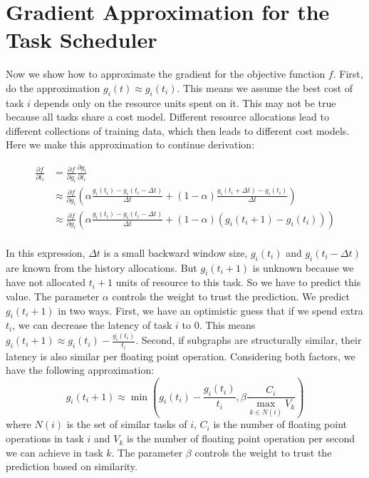 \section{Gradient Approximation for the Task Scheduler}
\label{sec:gradient-approximation}
Now we show how to approximate the gradient for the objective function $f$. First, do the approximation $g_i(t) \approx g_i(t_i)$.
This means we assume the best cost of task $i$ depends only on the resource units spent on it. This may not be true because all tasks share a cost model. Different resource allocations lead to different collections of training data, which then leads to different cost models.
Here we make this approximation to continue derivation:

\begin{align*}
\frac{\partial f}{\partial t_i} &= \frac{\partial f}{\partial g_i} \frac{\partial g_i}{\partial t_i} \\
&\approx \frac{\partial f}{\partial g_i} (\alpha \frac{g_i(t_i) - g_i(t_i - \Delta t)}{\Delta t}  
+ (1-\alpha)  \frac{g_i(t_i + \Delta t) - g_i(t_i)}{\Delta t} ) \\
&\approx \frac{\partial f}{\partial g_i} (\alpha \frac{g_i(t_i) - g_i(t_i - \Delta t)}{\Delta t}  
+ (1-\alpha)  (g_i(t_i + 1) - g_i(t_i))) \\
\end{align*}

\noindent In this expression, $\Delta t$ is a small backward window size, $g_i(t_i)$ and $g_i(t_i - \Delta t)$ are known from the history allocations. But $g_i(t_i + 1)$ is unknown because we have not allocated $t_i + 1$ units of resource to this task. So we have to predict this value.
The parameter $\alpha$ controls the weight to trust the prediction.
We predict $g_i(t_i + 1)$ in two ways. First, we have an optimistic guess that if we spend extra $t_i$, we can decrease the latency of task $i$ to 0. This means $g_i(t_i + 1) \approx g_i(t_i) - \frac{g_i(t_i)}{t_i}$.
Second, if subgraphs are structurally similar, their latency is also similar per floating point operation.
Considering both factors, we have the following approximation:
$$g_i(t_i + 1) \approx \min(g_i(t_i) - \frac{g_i(t_i)}{t_i}, \beta \frac{C_i}{\max_{k\in N(i)} {V_k}}) $$
\noindent where $N(i)$ is the set of similar tasks of $i$, $C_i$ is the number of floating point operations in task $i$ and $V_k$ is the number of floating point operation per second we can achieve in task $k$. The parameter $\beta$ controls the weight to trust the prediction based on similarity.

